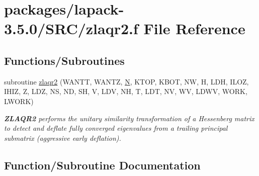 \hypertarget{zlaqr2_8f}{}\section{packages/lapack-\/3.5.0/\+S\+R\+C/zlaqr2.f File Reference}
\label{zlaqr2_8f}
\subsection*{Functions/\+Subroutines}
\begin{DoxyCompactItemize}
\item 
subroutine \hyperlink{zlaqr2_8f_a3de0348a1d15c5b1dded4b2fe0fdd852}{zlaqr2} (W\+A\+N\+T\+T, W\+A\+N\+T\+Z, \hyperlink{polmisc_8c_a0240ac851181b84ac374872dc5434ee4}{N}, K\+T\+O\+P, K\+B\+O\+T, N\+W, H, L\+D\+H, I\+L\+O\+Z, I\+H\+I\+Z, Z, L\+D\+Z, N\+S, N\+D, S\+H, V, L\+D\+V, N\+H, T, L\+D\+T, N\+V, W\+V, L\+D\+W\+V, W\+O\+R\+K, L\+W\+O\+R\+K)
\begin{DoxyCompactList}\small\item\em {\bfseries Z\+L\+A\+Q\+R2} performs the unitary similarity transformation of a Hessenberg matrix to detect and deflate fully converged eigenvalues from a trailing principal submatrix (aggressive early deflation). \end{DoxyCompactList}\end{DoxyCompactItemize}


\subsection{Function/\+Subroutine Documentation}
\hypertarget{zlaqr2_8f_a3de0348a1d15c5b1dded4b2fe0fdd852}{}
